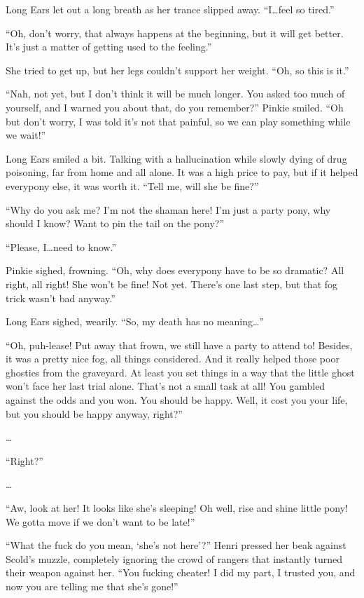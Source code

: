 Long Ears let out a long breath as her trance slipped away. ``I\dots feel so tired.''

``Oh, don't worry, that always happens at the beginning, but it will get better. It's just a matter of getting used to the feeling.''

She tried to get up, but her legs couldn't support her weight. ``Oh, so this is it.''

``Nah, not yet, but I don't think it will be much longer. You asked too much of yourself, and I warned you about that, do you remember?'' Pinkie smiled. ``Oh but don't worry, I was told it's not that painful, so we can play something while we wait!''

Long Ears smiled a bit. Talking with a hallucination while slowly dying of drug poisoning, far from home and all alone. It was a high price to pay, but if it helped everypony else, it was worth it. ``Tell me, will she be fine?''

``Why do you ask me? I'm not the shaman here! I'm just a party pony, why should I know? Want to pin the tail on the pony?''

``Please, I\dots need to know.''

Pinkie sighed, frowning. ``Oh, why does everypony have to be so dramatic? All right, all right! She won't be fine! Not yet. There's one last step, but that fog trick wasn't bad anyway.''

Long Ears sighed, wearily. ``So, my death has no meaning\dots''

``Oh, puh-lease! Put away that frown, we still have a party to attend to! Besides, it was a pretty nice fog, all things considered. And it really helped those poor ghosties from the graveyard. At least you set things in a way that the little ghost won't face her last trial alone. That's not a small task at all! You gambled against the odds and you won. You should be happy. Well, it cost you your life, but you should be happy anyway, right?''

\dots

``Right?''

\dots

``Aw, look at her! It looks like she's sleeping! Oh well, rise and shine little pony! We gotta move if we don't want to be late!''



\horizonline


``What the fuck do you mean, `she's not here'?'' Henri pressed her beak against Scold's muzzle, completely ignoring the crowd of rangers that instantly turned their weapon against her. ``You fucking cheater! I did my part, I trusted you, and now you are telling me that she's gone!''

